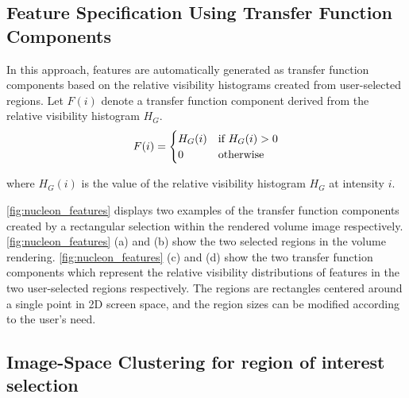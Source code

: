 \documentclass[twoside,twocolumn,10pt]{article}
\begin{document}


\subsection{Feature Specification Using Transfer Function Components}
In this approach, features are automatically generated as transfer function components based on the relative visibility histograms created from user-selected regions.
Let $F(i)$ denote a transfer function component derived from the relative visibility histogram $H_{G}$.
\[
F(i) =
\begin{cases}
H_{G}(i) & \text{if $ H_{G}(i)>0 $} \\
0 & \text{otherwise}
\end{cases}
\]

where $ H_{G}(i) $ is the value of the relative visibility histogram $ H_{G} $ at intensity $ i $.

\autoref{fig:nucleon_features} displays two examples of the transfer function components created by a rectangular selection within the rendered volume image respectively.
\autoref{fig:nucleon_features} (a) and (b) show the two selected regions in the volume rendering. \autoref{fig:nucleon_features} (c) and (d) show the two transfer function components which represent the relative visibility distributions of features in the two user-selected regions respectively. The regions are rectangles centered around a single point in 2D screen space, and the region sizes can be modified according to the user's need.

\subsection{Image-Space Clustering for region of interest selection}
\end{document}
